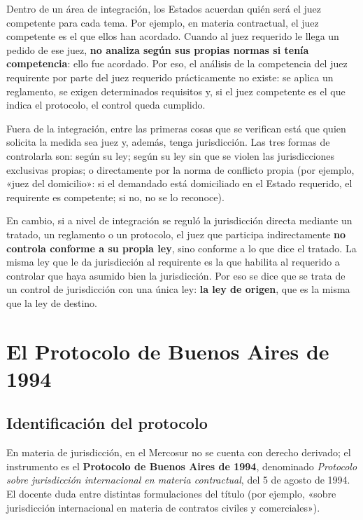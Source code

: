 \documentclass[12pt,oneside]{book}
\begin{document}
Dentro de un área de integración, los Estados acuerdan quién será el juez competente para cada tema. Por ejemplo, en materia contractual, el juez competente es el que ellos han acordado. Cuando al juez requerido le llega un pedido de ese juez, \textbf{no analiza según sus propias normas si tenía competencia}: ello fue acordado. Por eso, el análisis de la competencia del juez requirente por parte del juez requerido prácticamente no existe: se aplica un reglamento, se exigen determinados requisitos y, si el juez competente es el que indica el protocolo, el control queda cumplido.

Fuera de la integración, entre las primeras cosas que se verifican está que quien solicita la medida sea juez y, además, tenga jurisdicción. Las tres formas de controlarla son: según su ley; según su ley sin que se violen las jurisdicciones exclusivas propias; o directamente por la norma de conflicto propia (por ejemplo, «juez del domicilio»: si el demandado está domiciliado en el Estado requerido, el requirente es competente; si no, no se lo reconoce).

En cambio, si a nivel de integración se reguló la jurisdicción directa mediante un tratado, un reglamento o un protocolo, el juez que participa indirectamente \textbf{no controla conforme a su propia ley}, sino conforme a lo que dice el tratado. La misma ley que le da jurisdicción al requirente es la que habilita al requerido a controlar que haya asumido bien la jurisdicción. Por eso se dice que se trata de un control de jurisdicción con una única ley: \textbf{la ley de origen}, que es la misma que la ley de destino.

\section{El Protocolo de Buenos Aires de 1994}

\subsection{Identificación del protocolo}

En materia de jurisdicción, en el Mercosur no se cuenta con derecho derivado; el instrumento es el \textbf{Protocolo de Buenos Aires de 1994}, denominado \textit{Protocolo sobre jurisdicción internacional en materia contractual}, del 5 de agosto de 1994. El docente duda entre distintas formulaciones del título (por ejemplo, «sobre jurisdicción internacional en materia de contratos civiles y comerciales»).
\end{document}
